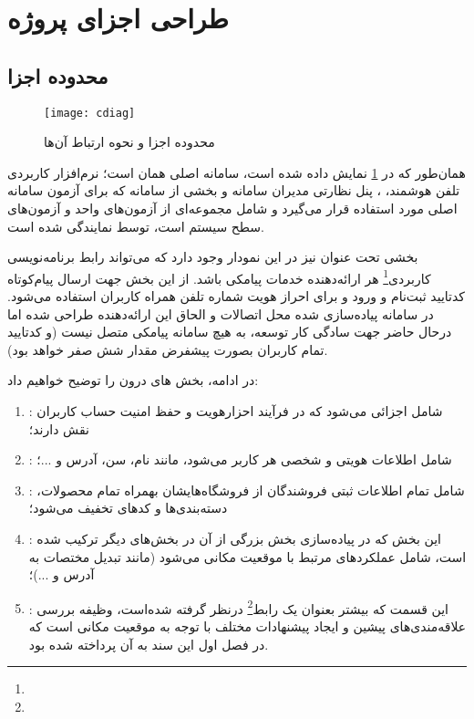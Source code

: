 \newpage

\section{طراحی اجزای پروژه}

\subsection{محدوده اجزا}

\begin{figure}[H]
	\centering
	\texttt{[image: cdiag]}
	\caption{محدوده اجزا و نحوه ارتباط آن‌ها}
	\label{fig:cdiag}
\end{figure}

همان‌طور که در \cref{fig:cdiag} نمایش داده شده است، سامانه اصلی همان  است؛ نرم‌افزار کاربردی تلفن هوشمند، ، پنل نظارتی مدیران سامانه  و بخشی از سامانه که برای آزمون سامانه اصلی مورد استفاده قرار می‌گیرد و شامل مجموعه‌ای از آزمون‌های واحد و آزمون‌های سطح سیستم است، توسط  نمایندگی شده است.

\newpage

بخشی تحت عنوان  نیز در این نمودار وجود دارد که می‌تواند رابط برنامه‌نویسی کاربردی\footnote{} هر ارائه‌دهنده خدمات پیامکی باشد. از این بخش جهت ارسال پیام‌کوتاه کدتایید ثبت‌نام و ورود و برای احراز هویت شماره تلفن همراه کاربران استفاده می‌شود. در سامانه پیاده‌سازی شده محل اتصالات و الحاق این ارائه‌دهنده طراحی شده اما درحال حاضر جهت سادگی کار توسعه، به هیچ سامانه پیامکی متصل نیست (و کدتایید تمام کاربران بصورت پیشفرض مقدار شش صفر خواهد بود).

در ادامه، بخش های درون  را توضیح خواهیم داد:

\begin{enumerate}
	\item {}: شامل اجزائی می‌شود که در فرآیند احزارهویت و حفظ امنیت حساب کاربران نقش دارند؛
	\item {}: شامل اطلاعات هویتی و شخصی هر کاربر می‌شود، مانند نام، سن، آدرس و ...؛
	\item {}: شامل تمام اطلاعات ثبتی فروشندگان از فروشگاه‌هایشان بهمراه تمام محصولات، دسته‌بندی‌ها و کدهای تخفیف می‌شود؛
	\item {}: این بخش که در پیاده‌سازی بخش بزرگی از آن در بخش‌های دیگر ترکیب شده است، شامل عملکردهای مرتبط با موقعیت مکانی می‌شود (مانند تبدیل مختصات به آدرس و ...)؛
	\item {}: این قسمت که بیشتر بعنوان یک رابط\footnote{} درنظر گرفته شده‌است، وظیفه بررسی علاقه‌مندی‌های پیشین و ایجاد پیشنهادات مختلف با توجه به موقعیت مکانی است که در فصل اول این سند به آن پرداخته شده بود.
\end{enumerate}

